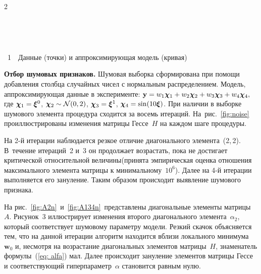 \begin{multicols}{2}
\setcounter{figure}{1}
\begin{figure*}[b] %
\vspace*{-3pt}
 \begin{center}
 \mbox{%
 \epsfxsize=161.853mm
 }
 \end{center}
 \vspace*{-9pt}
\label{fig:noise}
\end{figure*}


\begin{center}  %
 \mbox{%
 \epsfxsize=77.76mm
 }
 \end{center}
{{\figurename~1}\ \ \small{Данные (точки) и аппроксимирующая модель (кривая)}}




\vspace*{12pt}





\smallskip

\textbf{Отбор шумовых признаков.}
Шумовая выборка сформирована при помощи добавления столбца случайных
чисел с нормальным распределением. Модель, аппроксимирующая данные
в эксперименте:
$\mathbf{y}\hm=w_{1}\boldsymbol{\chi}_{1}\hm+w_{2}\boldsymbol{\chi}_{2}
\hm +w_{3}\boldsymbol{\chi}_{3}\hm+w_{4}\boldsymbol{\chi}_{4},$
где $\boldsymbol{\chi}_1\hm=\boldsymbol{\xi}^0$,
$\boldsymbol{\chi}_2\hm\sim\mathcal{N}(0,2)$,
$\boldsymbol{\chi}_3\hm=\boldsymbol{\xi}^1$,
$\boldsymbol{\chi}_4\hm=\sin(10\boldsymbol{\xi})$. При наличии
в выборке шумового элемента процедура сходится за восемь итераций.
На~рис.~\ref{fig:noise} про\-ил\-люст\-ри\-ро\-ва\-ны изменения матрицы
Гессе~$H$ на каждом шаге процедуры.


На 2-й итерации наблюдается резкое отличие диагонального
элемента~(2,\,2). В~течение итераций~2 и~3 он продолжает возрастать,
пока не достигает критической относительной величины\linebreak (принята
эмпирическая оценка отношения максимального элемента матрицы
к минимальному~$10^6$). Далее на 4-й итерации выполняется его
зануление. Таким образом происходит выявление шумового приз\-нака.

На рис.~\ref{fig:A2n}~и~\ref{fig:A134n}~представлены диагональные
элементы матрицы~$A$. Рисунок~3 иллюстрирует изменения второго
диагонального элемента~$\alpha_2$, который соответствует шумовому
параметру модели. Резкий скачок объясняется тем, что на данной
итерации алгоритм находится вблизи локального
минимума~$\mathbf{w}_0$ и, несмотря на возрастание диагональных
элементов матрицы~$H$, знаменатель формулы~(\ref{eq: alfa}) мал.
Далее происходит зануление элементов мат\-ри\-цы Гессе и
соответствующий гиперпараметр~$\alpha$ становится равным нулю.


\end{multicols}
